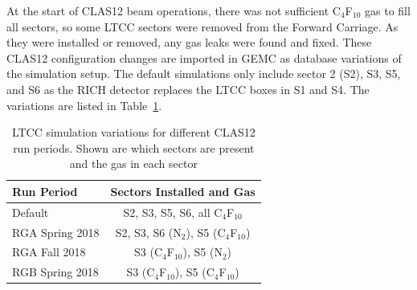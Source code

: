 At the start of CLAS12 beam operations, there was not sufficient C$_4$F$_{10}$ gas to fill all sectors, so some
LTCC sectors were removed from the Forward Carriage. As they were installed or removed, any gas leaks were
found and fixed.
These CLAS12 configuration changes are imported in GEMC as database variations of the simulation setup.
The default simulations only include sector 2 (S2), S3, S5, and S6 as the RICH detector replaces the LTCC
boxes in S1 and S4. The variations are listed in Table~\ref{tab:simVariations}.

\begin{table}
	\begin{center}
		\begin{tabular}{| l | c |}
			\hline \hline
			Run Period       & Sectors Installed and Gas \\
			\hline
			Default          & S2, S3, S5, S6, all C$_4$F$_{10}$    \\
			RGA Spring 2018  & S2, S3, S6 (N$_2$), S5 (C$_4$F$_{10}$)  \\
			RGA Fall 2018    & S3 (C$_4$F$_{10}$), S5 (N$_2$)          \\
			RGB Spring 2018  & S3 (C$_4$F$_{10}$), S5 (C$_4$F$_{10}$) \\
			\hline \hline
		\end{tabular}
	\end{center}
	\caption{LTCC simulation variations for different CLAS12 run periods. Shown are which sectors are present
          and the gas in each sector}
	\label{tab:simVariations}
\end{table}
